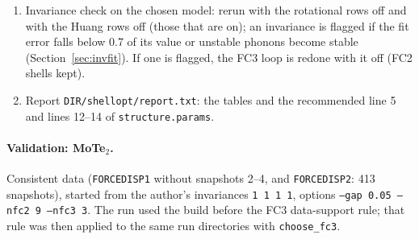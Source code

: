 \documentclass[11pt,a4paper]{article}
\newcommand{\code}[1]{\texttt{#1}}
\begin{document}
\begin{enumerate}
$\pm10$, start at the smallest radius and go to the next one as long as at least 25\,\% of the FC3 it adds exceed twice
their standard error.
\item Invariance check on the chosen model: rerun with the rotational rows off and with the Huang rows off (those that
are on); an invariance is flagged if the fit error falls below 0.7 of its value or unstable phonons become stable
(Section~\ref{sec:invfit}). If one is flagged, the FC3 loop is redone with it off (FC2 shells kept).
\item Report \code{DIR/shellopt/report.txt}: the tables and the recommended line 5 and lines 12--14 of
\code{structure.params}.
\end{enumerate}

\paragraph{Validation: MoTe$_2$.} Consistent data (\code{FORCEDISP1} without snapshots 2--4, and \code{FORCEDISP2}: 413
snapshots), started from the author's invariances \code{1 1 1 1}, options \code{--gap 0.05 --nfc2 9 --nfc3 3}. The run used
the build before the FC3 data-support rule; that rule was then applied to the same run directories with
\code{choose\_fc3}.
\end{document}
